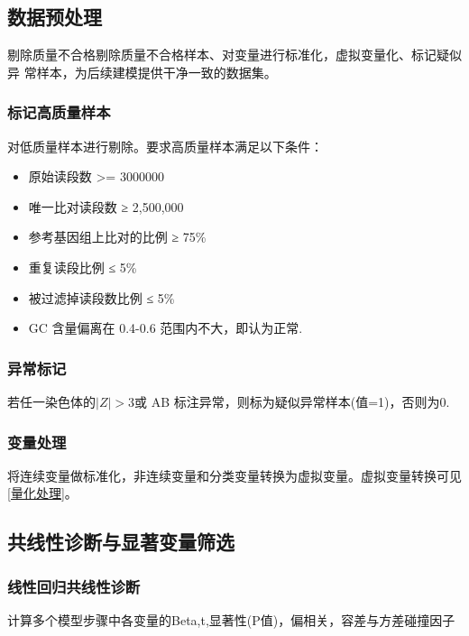 \documentclass[withoutpreface,notoc]{cumcmthesis}
\begin{document}
	\subsection{数据预处理}
	剔除质量不合格剔除质量不合格样本、对变量进行标准化，虚拟变量化、标记疑似异
	常样本，为后续建模提供干净一致的数据集。

	\subsubsection{标记高质量样本}

	对低质量样本进行剔除。要求高质量样本满足以下条件：
	\begin{itemize}
		\item 原始读段数 >= 3000000
		\item 唯一比对读段数 ≥ 2,500,000
		\item 参考基因组上比对的比例 ≥ 75\%
		\item 重复读段比例 ≤ 5\%
		\item 被过滤掉读段数比例 ≤ 5\%
		\item GC 含量偏离在 0.4-0.6 范围内不大，即认为正常.
	\end{itemize}

	\subsubsection{异常标记}

	若任一染色体的$|Z|>3$或 AB 标注异常，则标为疑似异常样本(值=1)，否则为0.


	\subsubsection{变量处理}

	将连续变量做标准化，非连续变量和分类变量转换为虚拟变量。虚拟变量转换可见\cref{量化处理}。

	

	\subsection{共线性诊断与显著变量筛选}

	\subsubsection{线性回归共线性诊断}
	计算多个模型步骤中各变量的Beta,t,显著性(P值)，偏相关，容差与方差碰撞因子
\end{document}
